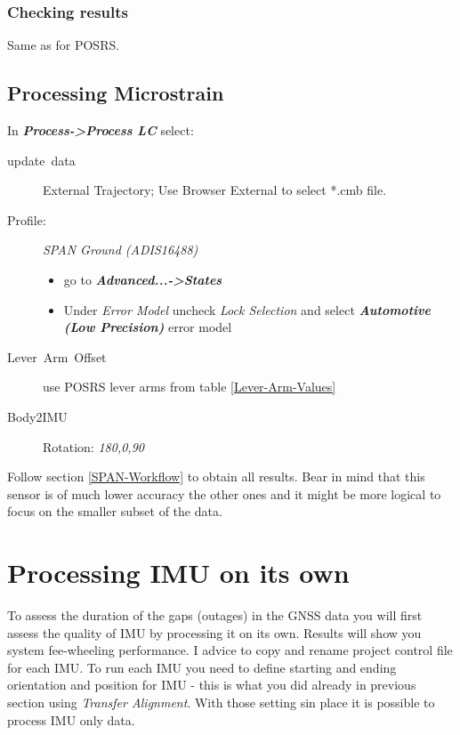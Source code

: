 \documentclass[11pt,fleqn]{book} %
\begin{document}
\subsection{Checking results}

Same as for POSRS.

\section{Processing Microstrain}\label{sub:Processing-Microstrain}

In \textbf{\emph{Process->Process LC}} select:
\begin{description}
	\item [{update~data}] External Trajectory; Use Browser External to select {*}.cmb file.
	\item [{Profile:}] \emph{SPAN Ground (ADIS16488) }
		\begin{itemize}
			\item go to \textbf{\emph{Advanced...->States}}
			\item Under \emph{Error Model} uncheck \emph{Lock Selection} and select \textbf{\emph{Automotive (Low Precision)}} error model
		\end{itemize}
	\item [{Lever~Arm~Offset}] use POSRS lever arms from table \ref{Lever-Arm-Values}
	\item [{Body2IMU}] Rotation: \emph{180,0,90 }
\end{description}

Follow section \ref{SPAN-Workflow} to obtain all results. Bear in mind that this sensor is of much lower accuracy the other ones and it might be more logical to focus on the smaller subset of the data.

\chapter{Processing IMU on its own}\label{Processing-IMU-on-its-own}

To assess the duration of the gaps (outages) in the GNSS data you will first assess the quality of IMU by processing it on its own. Results will show you system fee-wheeling performance. I advice to copy and rename project control file for each IMU. To run each IMU you need to define starting and ending orientation and position for IMU - this is what you did already in previous section using \emph{Transfer Alignment}. With those setting sin place it is possible to process IMU only data. 
\end{document}
